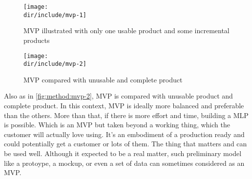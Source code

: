 \begin{figure}[!ht]
    \centering
    \texttt{[image: \\dir/include/mvp-1]}
    \caption[MVP illustrated]{MVP illustrated with only one usable product and some incremental products~\autocite{Mercury2014MVP}}
    \label{fig:method:mvp-1}
\end{figure}

\begin{figure}[!ht]
    \centering
    \texttt{[image: \\dir/include/mvp-2]}
    \caption[MVP compared]{MVP compared with unusable and complete product~\autocite{Mercury2014MVP}}
    \label{fig:method:mvp-2}
\end{figure}

Also as in \autoref{fig:method:mvp-2}, \ac{MVP} is compared with unusable product and complete product.
In this context, \ac{MVP} is ideally more balanced and preferable than the others.
More than that, if there is more effort and time, building a \ac{MLP} is possible.
Which is an \ac{MVP} but taken beyond a working thing, which the customer will actually love using.
It's an embodiment of a production ready and could potentially get a customer or lots of them.
The thing that matters and can be used well.
Although it expected to be a real matter, such preliminary model like a protoype, a mockup, or even a set of data can sometimes considered as an \ac{MVP}.
